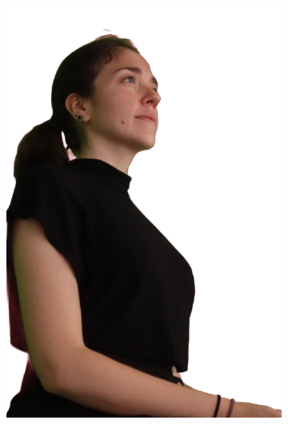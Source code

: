 \begin{figure}[!ht]
\begin{subfigure}{0.12\linewidth}
        \includegraphics[width=\textwidth]{Figures/results/initials/irene/21_render.png}

\end{subfigure}
\end{figure}
